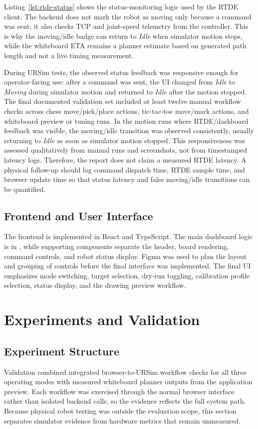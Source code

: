 \documentclass[12pt]{article}
\newcommand{\code}[1]{\path{#1}}
\begin{document}
Listing~\ref{lst:rtde-status} shows the status-monitoring logic used by the RTDE client. The backend does not mark the robot as moving only because a command was sent; it also checks TCP and joint-speed telemetry from the controller. This is why the moving/idle badge can return to \textit{Idle} when simulator motion stops, while the whiteboard ETA remains a planner estimate based on generated path length and not a live timing measurement.

During URSim tests, the observed status feedback was responsive enough for operator-facing use: after a command was sent, the UI changed from \textit{Idle} to \textit{Moving} during simulator motion and returned to \textit{Idle} after the motion stopped. The final documented validation set included at least twelve manual workflow checks across chess move/pick/place actions, tic-tac-toe move/mark actions, and whiteboard preview or tuning runs. In the motion runs where RTDE/dashboard feedback was visible, the moving/idle transition was observed consistently, usually returning to \textit{Idle} as soon as simulator motion stopped. This responsiveness was assessed qualitatively from manual runs and screenshots, not from timestamped latency logs. Therefore, the report does not claim a measured RTDE latency. A physical follow-up should log command dispatch time, RTDE sample time, and browser update time so that status latency and false moving/idle transitions can be quantified.

\subsection{Frontend and User Interface}
The frontend is implemented in React and TypeScript. The main dashboard logic is in \code{UI/src/App.tsx}, while supporting components separate the header, board rendering, command controls, and robot status display. Figma was used to plan the layout and grouping of controls before the final interface was implemented. The final UI emphasizes mode switching, target selection, dry-run toggling, calibration profile selection, status display, and the drawing preview workflow.

\vspace{1.0 em}

\section{Experiments and Validation}
\subsection{Experiment Structure}
Validation combined integrated browser-to-URSim workflow checks for all three operating modes with measured whiteboard planner outputs from the application preview. Each workflow was exercised through the normal browser interface rather than isolated backend calls, so the evidence reflects the full system path. Because physical robot testing was outside the evaluation scope, this section separates simulator evidence from hardware metrics that remain unmeasured.
\end{document}
